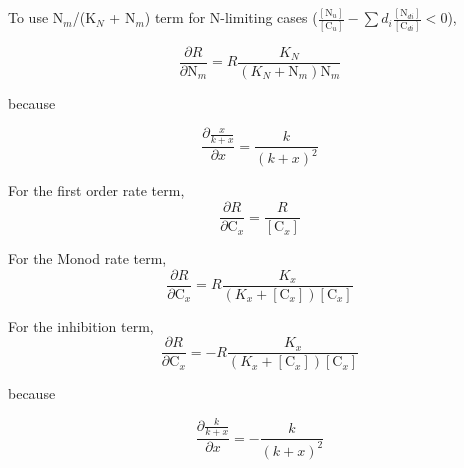 \documentclass[12pt, a4paper]{article}
\begin{document}
To use N$_m$/(K$_N$ + N$_m$) term for N-limiting cases ($\frac{[\text{N}_u]}{[\text{C}_u]} - \sum d_i \frac{[\text{N}_{di}]}{[\text{C}_{di}]} < 0$), 

\begin{equation}
\frac{\partial R}{\partial \text{N}_m} = R \frac{K_N}{(K_N + \text{N}_m)\text{N}_m}
\end{equation}

because 

\begin{equation}
\frac{\partial \frac{x}{k+x}}{\partial x} = \frac{k}{(k+x)^2}
\end{equation}

For the first order rate term,
\begin{equation}
\frac{\partial R}{\partial \text{C}_x} = \frac{R}{[\text{C}_x]}
\end{equation}

For the Monod rate term,
\begin{equation}
\frac{\partial R}{\partial \text{C}_x} = R \frac{K_x}{(K_x + [\text{C}_x])[\text{C}_x]}
\end{equation}

For the inhibition term,
\begin{equation}
\frac{\partial R}{\partial \text{C}_x} = -R \frac{K_x}{(K_x + [\text{C}_x])[\text{C}_x]}
\end{equation}

because 

\begin{equation}
\frac{\partial \frac{k}{k+x}}{\partial x} = -\frac{k}{(k+x)^2}
\end{equation}
\end{document}
